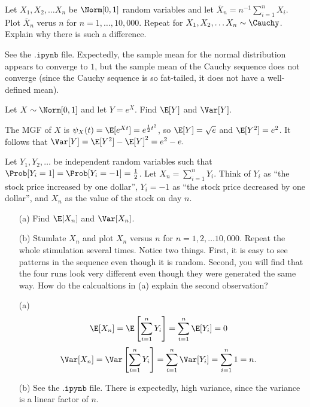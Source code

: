 \documentclass[a4paper]{article}
\begin{document}
\begin{Exercise}
	Let $X_1, X_2, \ldots X_n$ be $\Norm[0, 1]$ random variables and let $\overline{X}_n = n^{-1} \sum_{i = 1}^{n} X_i$. Plot $\overline{X}_n$ verus $n$ for $n = 1, \ldots , 10,000$. Repeat for $X_1, X_2, \ldots X_n \sim \Cauchy$. Explain why there is such a difference.
\end{Exercise}
\begin{Solution}
	See the $\texttt{.ipynb}$ file. Expectedly, the sample mean for the normal distribution appears to converge to $1$, but the sample mean of the Cauchy sequence does not converge (since the Cauchy sequence is so fat-tailed, it does not have a well-defined mean).
\end{Solution}
\begin{Exercise}
	Let $X \sim \Norm[0, 1]$ and let $Y = e^{X}$. Find $\E[Y]$ and $\Var[Y].$ 
\end{Exercise}
\begin{Solution}
	The MGF of $X$ is $\psi_X(t) = \E[e^{Xt}] = e^{\frac{1}{2}t^2}$, so 
	$\E[Y] = \sqrt{e}$ and $\E[Y^2] = e^2$. It follows that $\Var[Y] = \E[Y^2] - \E[Y]^2 = e^2 - e.$
\end{Solution}
\begin{Exercise}
	Let $Y_1, Y_2, \ldots $ be independent random variables such that $\Prob[Y_i = 1] = \Prob[Y_i = -1] = \frac{1}{2}$. Let $X_n = \sum_{i = 1}^n Y_i.$ Think of $Y_i$ as \enquote{the stock price increased by one dollar}, $Y_i = -1$ as \enquote{the stock price decreased by one dollar}, and $X_n$ as the value of the stock on day $n$.
	\begin{itemize}
		\item[(a)] Find $\E[X_n]$ and $\Var[X_n]$.
		\item[(b)] Stumlate $X_n$ and plot $X_n$ versus $n$ for $n = 1, 2, \ldots 10,000$. Repeat the whole stimulation several times. Notice two things. First, it is easy to see patterns in the sequence even though it is random. Second, you will find that the four runs look very different even though they were generated the same way. How do the calcualtions in (a) explain the second observation?
	\end{itemize}
\end{Exercise}
\begin{Solution}
	\begin{itemize}
		\item[(a)] 
		\begin{align*}
			\E[X_n] &= \E \left[ \sum_{i = 1}^n Y_i \right] = \sum_{i = 1}^n \E[Y_i] = 0
		\end{align*}
		\begin{align*}
			\Var[X_n] &= \Var \left[ \sum_{i = 1}^n Y_i \right] = \sum_{i = 1}^n \Var[Y_i] = \sum_{i = 1}^n 1 = n.
		\end{align*}
		\item[(b)] See the $\texttt{.ipynb}$ file. There is expectedly, high variance, since the variance is a linear factor of $n$.
	\end{itemize}
\end{Solution}
\end{document}
